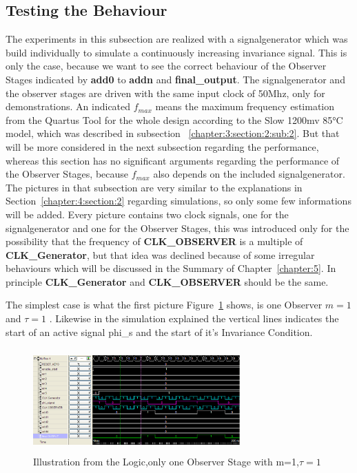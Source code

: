 \subsection{Testing the Behaviour}
\label{chapter:4:section:3:subsection:1}
The experiments in this subsection are realized with a signalgenerator which was build individually to simulate a continuously increasing invariance signal. 
This is only the case, because we want to see the correct behaviour of the Observer Stages indicated by \textbf{add0} to \textbf{addn} and \textbf{final\_output}. 
The signalgenerator and the observer stages are driven with the same input clock of 50Mhz, only for demonstrations. 
An indicated $f_{max}$ means the maximum frequency estimation from the Quartus Tool for the whole design according to the Slow 1200mv 85°C model, which was described in subsection ~\ref{chapter:3:section:2:sub:2}. 
But that will be more considered in the next subsection regarding the performance, whereas this section has no significant arguments regarding the performance of the Observer Stages, 
because $f_{max}$ also depends on the included signalgenerator. 
The pictures in that subsection are very similar to the explanations in Section~\ref{chapter:4:section:2} regarding simulations, so only some few informations will be added.
Every picture contains two clock signals, one for the signalgenerator and one for the Observer Stages, 
this was introduced only for the possibility that the frequency of \textbf{CLK\_OBSERVER} is a multiple of \textbf{CLK\_Generator}, 
but that idea was declined because of some irregular behaviours which will be discussed in the Summary of Chapter~\ref{chapter:5}. 
In principle \textbf{CLK\_Generator} and \textbf{CLK\_OBSERVER} should be the same. 


The simplest case is what the first picture Figure~\ref{fig:logicanalyzer:m1:t1} shows, is one Observer $m = 1$ and $\tau = 1$ .
Likewise in the simulation explained the vertical lines indicates the start of an active signal phi\_s and the start of it's Invariance Condition.

\begin{figure}[]
\centering
\includegraphics[width=300px,height=150px]{../../pictures/Logicanalyzer/Observer_1_Tau_1.png}
\caption[Logicanalyzer m=1,$\tau=1$]{Illustration from the Logic,only one Observer Stage with m=1,$\tau = 1$}
\label{fig:logicanalyzer:m1:t1}
\end{figure}

